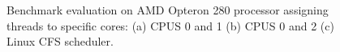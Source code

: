 \documentclass[conference]{IEEEtran}
\begin{document}
\begin{figure}[htb]
\centering
{}
\caption{Benchmark evaluation on AMD Opteron 280 processor assigning threads to specific cores: (a) CPUS 0 and 1 (b) CPUS 0 and 2 (c) Linux CFS scheduler.}
\label{fig:opteron_eval}
\end{figure}
\end{document}
